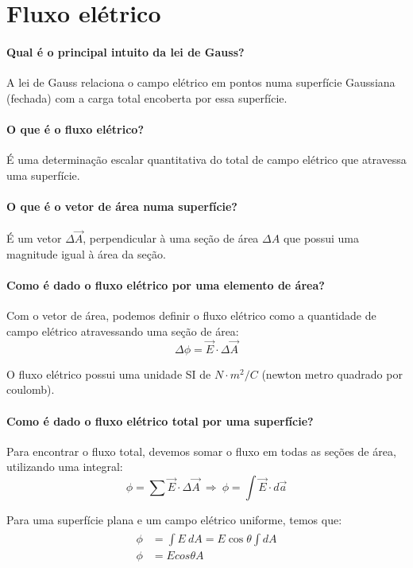 
\section*{Fluxo elétrico}

  \paragraph{Qual é o principal intuito da lei de Gauss?} A lei de Gauss relaciona o campo elétrico em pontos numa superfície Gaussiana (fechada) com a carga total encoberta por essa superfície.

  \paragraph{O que é o fluxo elétrico?} É uma determinação escalar quantitativa do total de campo elétrico que atravessa uma superfície. 

  \paragraph{O que é o vetor de área numa superfície?} É um vetor $ \Delta \vec{A} $, perpendicular à uma seção de área $ \Delta A $ que possui uma magnitude igual à área da seção.

  \paragraph{Como é dado o fluxo elétrico por uma elemento de área?} Com o vetor de área, podemos definir o fluxo elétrico como a quantidade de campo elétrico atravessando uma seção de área:
  \[
    \Delta \phi = \vec{E} \cdot \Delta \vec{A}
  \]

  O fluxo elétrico possui uma unidade SI de $ N \cdot m^2/C $ (newton metro quadrado por coulomb).

  \paragraph{Como é dado o fluxo elétrico total por uma superfície?} Para encontrar o fluxo total, devemos somar o fluxo em todas as seções de área, utilizando uma integral:
  \[
    \phi = \sum \vec{E} \cdot \Delta \vec{A} \ \Rightarrow \ \phi = \int \vec{E} \cdot d \vec{a}
  \]

  Para uma superfície plana e um campo elétrico uniforme, temos que: 
  \begin{gather}
    \begin{align}
      \phi &= \int E \ dA = E \cos{\theta} \int dA \\
      \phi &= E cos \theta A
    \end{align}
  \end{gather}

